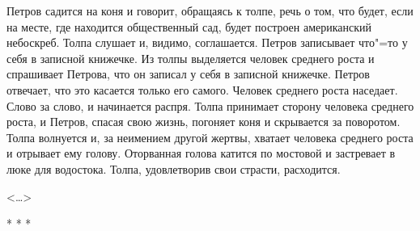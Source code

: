 Петров садится на коня и говорит, обращаясь к толпе, речь о том, что будет, если на месте, где находится общественный сад, будет построен американский небоскреб. Толпа слушает и, видимо, соглашается. Петров записывает что"=то у себя в записной книжечке. Из толпы выделяется человек среднего роста и спрашивает Петрова, что он записал у себя в записной книжечке. Петров отвечает, что это касается только его самого. Человек среднего роста наседает. Слово за слово, и начинается распря. Толпа принимает сторону человека среднего роста, и Петров, спасая свою жизнь, погоняет коня и скрывается за поворотом. Толпа волнуется и, за неимением другой жертвы, хватает человека среднего роста и отрывает ему голову. Оторванная голова катится по мостовой и застревает в люке для водостока. Толпа, удовлетворив свои страсти, расходится.

\begin{flushright}
<\dots{}>
\end{flushright}

\begin{center}
* * *
\end{center}
